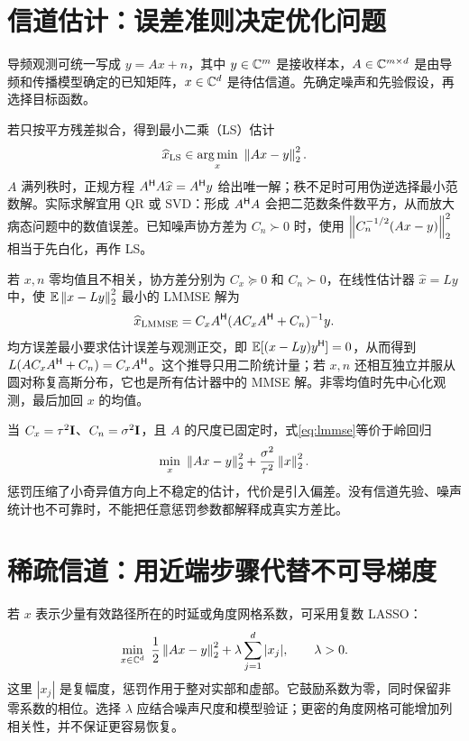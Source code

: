 \section{信道估计：误差准则决定优化问题}
导频观测可统一写成 $y=Ax+n$，其中 $y\in\mathbb C^m$ 是接收样本，$A\in\mathbb C^{m\times d}$ 是由导频和传播模型确定的已知矩阵，$x\in\mathbb C^d$ 是待估信道。先确定噪声和先验假设，再选择目标函数。

若只按平方残差拟合，得到最小二乘（LS）估计
\begin{equation}
 \widehat x_{\rm LS}\in\argmin_x\ \norm{Ax-y}_2^2.
\end{equation}
$A$ 满列秩时，正规方程 $A^\mathsf H A\widehat x=A^\mathsf H y$ 给出唯一解；秩不足时可用伪逆选择最小范数解。实际求解宜用 QR 或 SVD：形成 $A^\mathsf H A$ 会把二范数条件数平方，从而放大病态问题中的数值误差。已知噪声协方差为 $C_n\succ0$ 时，使用 $\left\lVert C_n^{-1/2}(Ax-y)\right\rVert_2^2$ 相当于先白化，再作 LS。

若 $x,n$ 零均值且不相关，协方差分别为 $C_x\succeq0$ 和 $C_n\succ0$，在线性估计器 $\widehat x=Ly$ 中，使 $\mathbb E\left\lVert x-Ly\right\rVert_2^2$ 最小的 LMMSE 解为
\begin{equation}
 \widehat x_{\rm LMMSE}
 =C_xA^\mathsf H(AC_xA^\mathsf H+C_n)^{-1}y.
 \label{eq:lmmse}
\end{equation}
均方误差最小要求估计误差与观测正交，即
$\mathbb E[(x-Ly)y^\mathsf H]=0$，从而得到
$L(AC_xA^\mathsf H+C_n)=C_xA^\mathsf H$。这个推导只用二阶统计量；若 $x,n$ 还相互独立并服从圆对称复高斯分布，它也是所有估计器中的 MMSE 解。非零均值时先中心化观测，最后加回 $x$ 的均值。

当 $C_x=\tau^2\mathbf I$、$C_n=\sigma^2\mathbf I$，且 $A$ 的尺度已固定时，式\eqref{eq:lmmse}等价于岭回归
\begin{equation}
 \min_x\ \norm{Ax-y}_2^2+\frac{\sigma^2}{\tau^2}\norm x_2^2.
\end{equation}
惩罚压缩了小奇异值方向上不稳定的估计，代价是引入偏差。没有信道先验、噪声统计也不可靠时，不能把任意惩罚参数都解释成真实方差比。

\section{稀疏信道：用近端步骤代替不可导梯度}
若 $x$ 表示少量有效路径所在的时延或角度网格系数，可采用复数 LASSO：
\begin{equation}
 \min_{x\in\C^d}\ \frac12\norm{Ax-y}_2^2+\lambda\sum_{j=1}^d|x_j|,
 \qquad\lambda>0.
 \label{eq:complex-lasso}
\end{equation}
这里 $|x_j|$ 是复幅度，惩罚作用于整对实部和虚部。它鼓励系数为零，同时保留非零系数的相位。选择 $\lambda$ 应结合噪声尺度和模型验证；更密的角度网格可能增加列相关性，并不保证更容易恢复。

